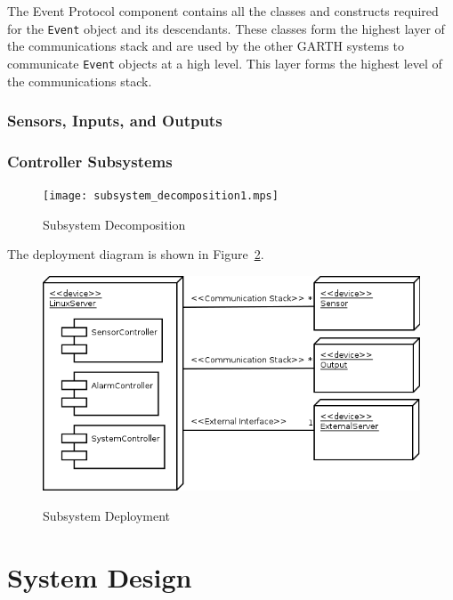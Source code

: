 \documentclass{report}
\begin{document}
The Event Protocol component contains all the classes and constructs
required for the \texttt{Event} object and its descendants. These
classes form the highest layer of the communications stack and are
used by the other GARTH systems to communicate \texttt{Event} objects
at a high level. This layer forms the highest level of the
communications stack.

\subsection{Sensors, Inputs, and Outputs}



\subsection{Controller Subsystems}

\begin{figure}[hp]
    \centering
        \caption{Subsystem Decomposition}
        \scriptsize
        \setlength{\unitlength}{2.0em}
        \texttt{[image: subsystem\_decomposition1.mps]}
        \normalsize
    \label{fig:subsystem_decomposition}
\end{figure}

The deployment diagram is shown in Figure~\ref{fig:subsystem_deployment}.

\begin{figure}[hp]
  \centering
  \caption{Subsystem Deployment}
  \includegraphics[scale=0.5]{deployment.png}
  \label{fig:subsystem_deployment}
\end{figure}

\chapter{System Design} %
\label{ch:system-design}
\end{document}
